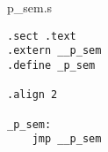 p\_sem.s

\begin{verbatim}
.sect .text
.extern __p_sem
.define _p_sem

.align 2

_p_sem:
	jmp __p_sem
\end{verbatim}
